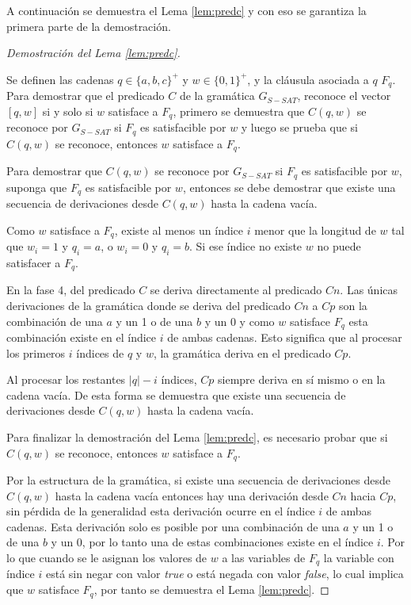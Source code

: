 \documentclass[12pt]{article}
\newcommand{\true}{\textit{true}}
\newcommand{\false}{\textit{false}}
\begin{document}
A continuación se demuestra el Lema \ref{lem:predc} y con eso se garantiza la primera parte de la demostración.

\begin{proof}[Demostración del Lema \ref{lem:predc}] \
    
    Se definen las cadenas $q\in \{a,b,c\}^+$ y $w\in \{0,1\}^+$, y la cláusula asociada a $q$ $F_q$.  Para demostrar que el predicado $C$ de la gramática $G_{S-SAT}$, reconoce el vector $[q,w]$ si y solo si $w$ satisface a $F_q$, primero se demuestra que $C(q,w)$ se reconoce por $G_{S-SAT}$ si $F_q$ es satisfacible por $w$ y luego se prueba que si $C(q,w)$ se reconoce, entonces $w$ satisface a $F_q$.
    
    Para demostrar que $C(q,w)$ se reconoce por $G_{S-SAT}$ si $F_q$ es satisfacible por $w$, suponga que $F_q$ es satisfacible por $w$, entonces se debe demostrar que existe una secuencia de derivaciones desde $C(q,w)$ hasta la cadena vacía.
    
    Como $w$ satisface a $F_q$, existe al menos un índice $i$ menor que la longitud de $w$ tal que $w_i=1$ y $q_i = a$, o $w_i=0$ y $q_i=b$. Si ese índice no existe $w$ no puede satisfacer a $F_q$.
    
    En la fase 4, del predicado $C$ se deriva directamente al predicado $Cn$. Las únicas derivaciones de la gramática donde se deriva del predicado $Cn$ a $Cp$ son la combinación de una $a$ y un 1 o de una $b$ y un 0 y como $w$ satisface $F_q$ esta combinación existe en el índice $i$ de ambas cadenas. Esto significa que al procesar los primeros $i$ índices de $q$ y $w$, la gramática deriva en el predicado $Cp$. 
    
    Al procesar los restantes $|q|-i$ índices, $Cp$ siempre deriva en sí mismo o en la cadena vacía. De esta forma se demuestra que existe una secuencia de derivaciones desde $C(q,w)$ hasta la cadena vacía.
    
    Para finalizar la demostración del Lema \ref{lem:predc}, es necesario probar que si $C(q,w)$ se reconoce, entonces $w$ satisface a $F_q$. 
    
    Por la estructura de la gramática, si existe una secuencia de derivaciones desde $C(q,w)$ hasta la cadena vacía entonces hay una derivación desde $Cn$ hacia $Cp$, sin pérdida de la generalidad esta derivación ocurre en el índice $i$ de ambas cadenas. Esta derivación solo es posible por una combinación de una $a$ y un 1 o de una $b$ y un 0, por lo tanto una de estas combinaciones existe en el índice $i$. Por lo que cuando se le asignan los valores de $w$ a las variables de $F_q$ la variable con índice $i$ está
    sin negar con valor \true{} o está negada con valor \false{}, lo cual implica que $w$ satisface $F_q$, por tanto se demuestra el Lema \ref{lem:predc}.
\end{proof}
\end{document}
